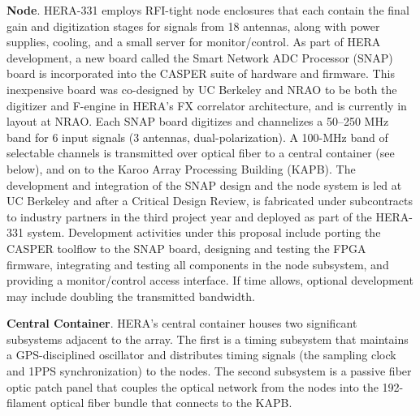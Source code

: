 \documentclass[preprint]{aastex}
\begin{document}


{\bf Node}. HERA-331 employs RFI-tight node enclosures that each contain the final gain and digitization stages for
signals from 18 antennas, along with power supplies, cooling, and a small server for monitor/control.  
As part of HERA development,
a new board called the Smart Network ADC Processor (SNAP) board is incorporated 
into the CASPER suite of hardware and firmware. This inexpensive board was co-designed by UC Berkeley and NRAO to be
both the digitizer and F-engine in HERA's FX correlator architecture,
and is currently in layout at NRAO.  Each SNAP board 
digitizes and channelizes a 50--250 MHz band for 6 input signals (3 antennas, dual-polarization).
A 100-MHz band of selectable channels is transmitted over optical fiber
to a central container (see below), and on to the Karoo Array Processing Building (KAPB).  The development and integration of the SNAP
design and the node system is led at UC Berkeley and after a Critical Design Review, is fabricated
under subcontracts to industry partners in the third project year and deployed as part of the HERA-331 system.
Development activities under this proposal include porting the CASPER toolflow to
the SNAP board, designing and testing the FPGA firmware,
integrating and testing all components in the node subsystem, and providing a monitor/control
access interface.  If time allows, optional development may include doubling the transmitted bandwidth.

{\bf Central Container}.
HERA's central container houses two significant subsystems adjacent to the array.  The first is a timing subsystem
that maintains a GPS-disciplined oscillator and distributes timing
signals (the sampling clock and 1PPS synchronization) to the nodes.  The second
subsystem is a passive fiber optic patch panel that couples
the optical network from the nodes into the 192-filament optical fiber bundle 
that connects to the KAPB. 
\end{document}
